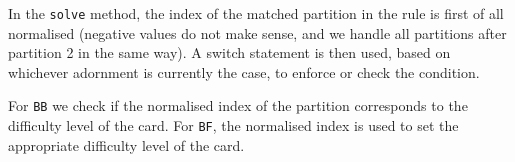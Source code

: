 In the \texttt{solve} method, the index of the matched partition in the rule is first of all normalised (negative values do not make sense, and we handle all partitions  after partition 2 in the same way).
A switch statement is then used, based on whichever adornment is currently the case, to enforce or check the condition. 

For \texttt{BB} we check if the normalised index of the partition corresponds to the difficulty level of the card.
For \texttt{BF}, the normalised index is used to set the appropriate difficulty level of the card.

